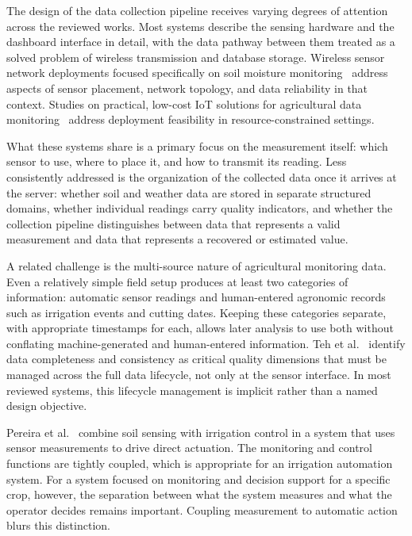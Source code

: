The design of the data collection pipeline receives varying degrees of
attention across the reviewed works. Most systems describe the sensing hardware
and the dashboard interface in detail, with the data pathway between them
treated as a solved problem of wireless transmission and database storage.
Wireless sensor network deployments focused specifically on soil moisture
monitoring~\cite{lloret2021soil_moisture_wsn} address aspects of sensor
placement, network topology, and data reliability in that
context.
Studies on practical, low-cost IoT solutions for agricultural data
monitoring~\cite{cheap_practical_iot_agri_monitoring} address deployment
feasibility in resource-constrained
settings.

What these systems share is a primary focus on the measurement itself: which
sensor to use, where to place it, and how to transmit its reading. Less
consistently addressed is the organization of the collected data once it
arrives at the server: whether soil and weather data are stored in separate
structured domains, whether individual readings carry quality indicators, and
whether the collection pipeline distinguishes between data that represents a
valid measurement and data that represents a recovered or estimated value.

A related challenge is the multi-source nature of agricultural monitoring
data. Even a relatively simple field setup produces at least two categories of
information: automatic sensor readings and human-entered agronomic records such
as irrigation events and cutting dates. Keeping these categories separate, with
appropriate timestamps for each, allows later analysis to use both without
conflating machine-generated and human-entered information. Teh et
al.~\cite{teh2020sensor_data_quality} identify data completeness and
consistency as critical quality dimensions that must be managed across the full
data lifecycle, not only at the sensor interface. In most reviewed systems,
this lifecycle management is implicit rather than a named design objective.

Pereira et al.~\cite{pereira2023esp32_drip_irrigation} combine soil sensing
with irrigation control in a system that uses sensor measurements to drive
direct actuation. The monitoring and control functions are tightly coupled,
which is appropriate for an irrigation automation system. For a system focused
on monitoring and decision support for a specific crop, however, the separation
between what the system measures and what the operator decides remains
important. Coupling measurement to automatic action blurs this distinction.

